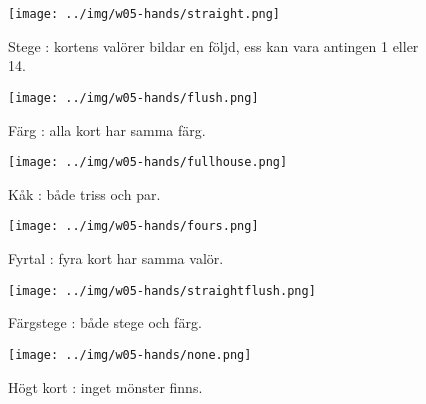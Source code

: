 \begin{figure}[H]
 \begin{minipage}[c]{\CardWidth}
  \texttt{[image: ../img/w05-hands/straight.png]}
 \end{minipage}\hfill
 \begin{minipage}[c]{\CardCaptionWidth}
  \caption{Stege : kortens valörer bildar en följd, ess kan vara antingen 1 eller 14.}
 \end{minipage}
\end{figure}

\begin{figure}[H]
 \begin{minipage}[c]{\CardWidth}
  \texttt{[image: ../img/w05-hands/flush.png]}
 \end{minipage}\hfill
 \begin{minipage}[c]{\CardCaptionWidth}
  \caption{Färg : alla kort har samma färg.}
 \end{minipage}
\end{figure}

\begin{figure}[H]
 \begin{minipage}[c]{\CardWidth}
  \texttt{[image: ../img/w05-hands/fullhouse.png]}
 \end{minipage}\hfill
 \begin{minipage}[c]{\CardCaptionWidth}
  \caption{Kåk : både triss och par.}
 \end{minipage}
\end{figure}

\begin{figure}[H]
 \begin{minipage}[c]{\CardWidth}
  \texttt{[image: ../img/w05-hands/fours.png]}
 \end{minipage}\hfill
 \begin{minipage}[c]{\CardCaptionWidth}
  \caption{Fyrtal : fyra kort har samma valör.}
 \end{minipage}
\end{figure}

\begin{figure}[H]
 \begin{minipage}[c]{\CardWidth}
  \texttt{[image: ../img/w05-hands/straightflush.png]}
 \end{minipage}\hfill
 \begin{minipage}[c]{\CardCaptionWidth}
  \caption{Färgstege : både stege och färg.}
 \end{minipage}
\end{figure}

\begin{figure}[H]
 \begin{minipage}[c]{\CardWidth}
  \texttt{[image: ../img/w05-hands/none.png]}
 \end{minipage}\hfill
 \begin{minipage}[c]{\CardCaptionWidth}
  \caption{Högt kort : inget mönster finns.}
 \label{lab:shuffle:last-picture}
  \end{minipage}
\end{figure}
